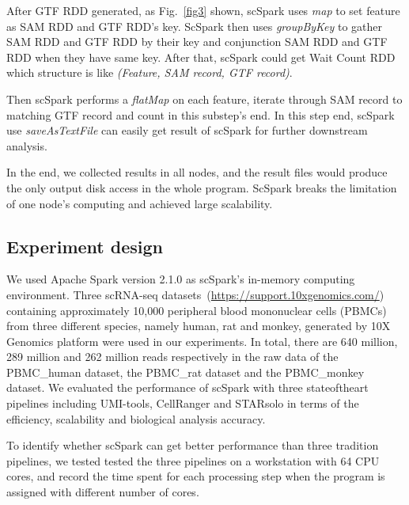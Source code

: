 \documentclass[conference]{IEEEtran}
\begin{document}
After GTF RDD generated, as Fig.~\ref{fig3} shown, scSpark uses \textit{map} to set feature as SAM RDD and GTF RDD's key.
ScSpark then uses \textit{groupByKey} to gather SAM RDD and GTF RDD by their key and conjunction SAM RDD and GTF RDD when they have same key.
After that, scSpark could get Wait Count RDD which structure is like \textit{(Feature, SAM record, GTF record)}.

Then scSpark performs a \textit{flatMap} on each feature, iterate through SAM record to matching GTF record and count in this substep's end.
In this step end, scSpark use \textit{saveAsTextFile} can easily get result of scSpark for further downstream analysis.

In the end, we collected results in all nodes, and the result files would produce the only output disk access in the whole program. 
ScSpark breaks the limitation of one node's computing and achieved large scalability. 

\subsection{Experiment design}
We used Apache Spark version 2.1.0 as scSpark's in-memory computing environment.
Three scRNA-seq datasets~(\url{https://support.10xgenomics.com/}) containing approximately 10,000 peripheral blood mononuclear cells (PBMCs) from three different species, namely human, rat and monkey, generated by 10X Genomics platform were used in our experiments. In total, there are 640 million, 289 million and 262 million reads respectively in the raw data of the PBMC\_human dataset, the PBMC\_rat dataset and the PBMC\_monkey dataset.
We evaluated the performance of scSpark with three state\-of\-the\-art pipelines including UMI-tools, CellRanger and STARsolo in terms of the efficiency, scalability and biological analysis accuracy.

To identify whether scSpark can get better performance than three tradition pipelines, we tested 
tested the three pipelines on a workstation with 64 CPU cores, and record the time spent for each processing step when the program is assigned with different number of cores. 

\end{document}
